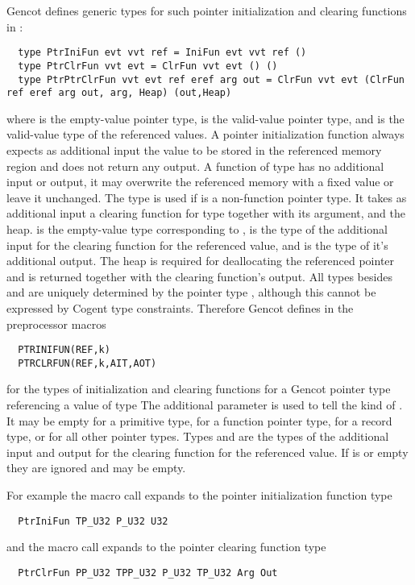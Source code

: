 Gencot defines generic types for such pointer initialization and clearing functions in :
\begin{verbatim}
  type PtrIniFun evt vvt ref = IniFun evt vvt ref ()
  type PtrClrFun vvt evt = ClrFun vvt evt () ()
  type PtrPtrClrFun vvt evt ref eref arg out = ClrFun vvt evt (ClrFun ref eref arg out, arg, Heap) (out,Heap)
\end{verbatim}
where  is the empty-value pointer type,  is the valid-value pointer type, and  is the valid-value
type of the referenced values. A pointer initialization function always expects as additional input the value to be stored in
the referenced memory region and does not return any output. A function of type  has no additional input or output, 
it may overwrite the referenced memory
with a fixed value or leave it unchanged. The type  is used if  is a non-function pointer type. It takes 
as additional input a clearing function for type  together with its argument, and the heap.  is the empty-value type
corresponding to ,  is the type of the additional input for the clearing function for the referenced value,
and  is the type of it's additional output. The heap is required for deallocating the referenced pointer and is returned 
together with the clearing function's output.
All types besides  and  are uniquely determined by the 
pointer type , although this cannot be expressed by Cogent type constraints. Therefore Gencot  defines in 
 the preprocessor macros
\begin{verbatim}
  PTRINIFUN(REF,k)
  PTRCLRFUN(REF,k,AIT,AOT)
\end{verbatim}
for the types of initialization and clearing functions for a Gencot pointer type referencing a value of type 
The additional parameter  is used to tell the kind of . It may be empty for a primitive type,
 for a function pointer type,  for a record type, or  for all other pointer types. Types 
and 
are the types of the additional input and output for the clearing function for the referenced value. If  is  or
empty they are ignored and may be empty.

For example the macro call  expands to the pointer initialization function type
\begin{verbatim}
  PtrIniFun TP_U32 P_U32 U32
\end{verbatim}
and the macro call  expands to the pointer clearing function type
\begin{verbatim}
  PtrClrFun PP_U32 TPP_U32 P_U32 TP_U32 Arg Out
\end{verbatim}

